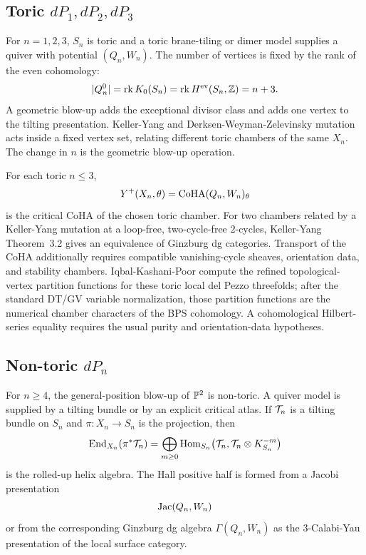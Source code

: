\subsection*{Toric \(dP_1,dP_2,dP_3\)}

For \(n=1,2,3\), \(S_n\) is toric and a toric brane-tiling or dimer
model supplies a quiver with potential \((Q_n,W_n)\). The number of
vertices is fixed by the rank of the even cohomology:
\[
  |Q_n^0|=\mathrm{rk}\,K_0(S_n)=\mathrm{rk}\,H^{\mathrm{ev}}(S_n,\Z)
  =n+3.
\]
A geometric blow-up adds the exceptional divisor class and adds one
vertex to the tilting presentation. Keller-Yang and
Derksen-Weyman-Zelevinsky mutation acts inside a fixed vertex set,
relating different toric chambers of the same \(X_n\). The change in
\(n\) is the geometric blow-up operation.

For each toric \(n\leq3\),
\[
  \Yp(X_n,\theta)=\CoHA(Q_n,W_n)_\theta
\]
is the critical CoHA of the chosen toric chamber. For two chambers related
by a Keller-Yang mutation at a loop-free, two-cycle-free
\(2\)-cycles, Keller-Yang Theorem~3.2 gives an equivalence of Ginzburg
dg categories. Transport of the CoHA additionally requires compatible
vanishing-cycle sheaves, orientation data, and stability chambers.
Iqbal-Kashani-Poor compute the refined
topological-vertex partition functions for these toric local del Pezzo
threefolds; after the standard DT/GV variable normalization, those
partition functions are the numerical chamber characters of the BPS
cohomology. A cohomological Hilbert-series equality requires the usual
purity and orientation-data hypotheses.

\subsection*{Non-toric \(dP_n\)}

For \(n\geq4\), the general-position blow-up of \(\P^2\) is non-toric.
A quiver model is supplied by a tilting bundle or by an explicit
critical atlas. If \(\TP_n\) is a tilting bundle on \(S_n\) and
\(\pi:X_n\to S_n\) is the projection, then
\[
  \mathrm{End}_{X_n}(\pi^*\TP_n)
  =
  \bigoplus_{m\geq0}
  \mathrm{Hom}_{S_n}\!\left(\TP_n,\TP_n\otimes K_{S_n}^{-m}\right)
\]
is the rolled-up helix algebra. The Hall positive half is formed from a
Jacobi presentation
\[
  \Jac(Q_n,W_n)
\]
or from the corresponding Ginzburg dg algebra \(\Gamma(Q_n,W_n)\) as
the \(3\)-Calabi-Yau presentation of the local surface category.

